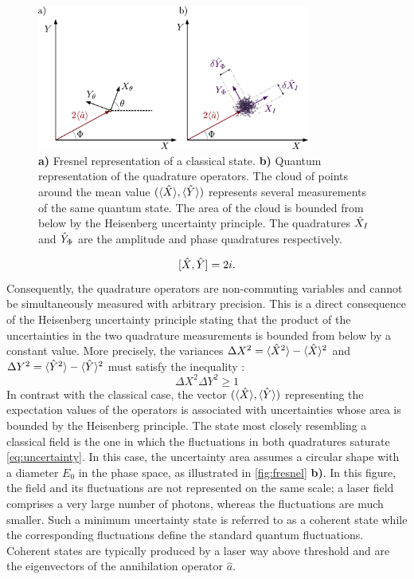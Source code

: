 \begin{figure}
    \centering
    \includegraphics[width=0.8\textwidth]{chap_correlation/fig/fresnel.pdf}
    \caption{ \textbf{a)} Fresnel representation of a classical state. \textbf{b)} Quantum representation 
    of the quadrature operators. The cloud of points around the mean value $(\langle \hat{X} \rangle, \langle \hat{Y} \rangle)$ represents several measurements of the same quantum state. The area of the cloud 
    is bounded from below by the Heisenberg uncertainty principle. The quadratures $\hat{X}_{I}$ and $\hat{Y}_{\Phi}$ are the amplitude and phase quadratures respectively.}
    \label{fig:fresnel}
\end{figure}


\begin{equation}
    \label{eq:commut}
    [\hat{X},\hat{Y}] = 2i.
\end{equation}
Consequently, the quadrature operators are non-commuting variables and cannot be simultaneously measured with arbitrary precision. This is a direct consequence of the Heisenberg uncertainty principle stating that the product of the uncertainties in the two quadrature measurements is bounded from below by a constant value.
More precisely, the variances $\Delta X^2 = \langle \hat{X}^2 \rangle - \langle \hat{X} \rangle^2$ and $\Delta Y^2 = \langle \hat{Y}^2 \rangle - \langle \hat{Y} \rangle^2$ must satisfy the inequality :
\begin{equation}
    \label{eq:uncertainty}
    \Delta X^2 \Delta Y^2 \geq 1
\end{equation}
In contrast with the classical case, the vector $(\langle \hat{X} \rangle, \langle \hat{Y} \rangle)$ representing the expectation values of the operators is associated with uncertainties whose area is bounded by the Heisenberg principle. 
The state most closely resembling a classical field is the one in which the fluctuations in both quadratures saturate \autoref{eq:uncertainty}. In this case, the uncertainty area assumes a circular shape with a diameter $E_0$ in the phase space, as illustrated in \autoref{fig:fresnel} \textbf{b)}. In this figure, the field and its fluctuations are not represented on the same scale; a laser field comprises a very large number of photons, whereas the fluctuations are much smaller. 
Such a minimum uncertainty state is referred to as a coherent state while the corresponding fluctuations define the standard quantum fluctuations. Coherent
states are typically produced by a laser way above threshold and are the eigenvectors of the annihilation operator $\hat{a}$.

